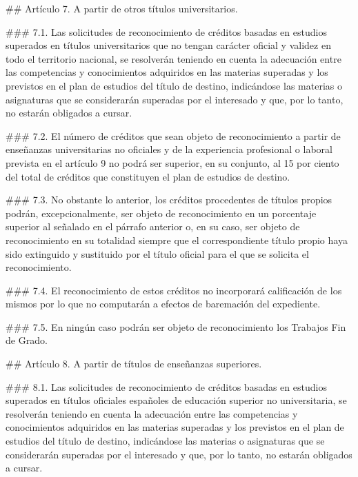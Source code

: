 \documentclass{article}
\begin{document}
\begin{itemize}
\begin{itemize}
\begin{scriptsize}
                  \#\# Artículo 7. A partir de otros títulos universitarios.

                  \#\#\# 7.1.
                  Las solicitudes de reconocimiento de créditos basadas en estudios superados en títulos universitarios que no tengan carácter oficial y validez en todo el territorio nacional, se resolverán teniendo en cuenta la adecuación entre las competencias y conocimientos adquiridos en las materias superadas y los previstos en el plan de estudios del título de destino, indicándose las materias o asignaturas que se considerarán superadas por el interesado y que, por lo tanto, no estarán obligados a cursar.

                  \#\#\# 7.2.
                  El número de créditos que sean objeto de reconocimiento a partir de enseñanzas universitarias no oficiales y de la experiencia profesional o laboral prevista en el artículo 9 no podrá ser superior, en su conjunto, al 15 por ciento del total de créditos que constituyen el plan de estudios de destino.

                  \#\#\# 7.3.
                  No obstante lo anterior, los créditos procedentes de títulos propios podrán, excepcionalmente, ser objeto de reconocimiento en un porcentaje superior al señalado en el párrafo anterior o, en su caso, ser objeto de reconocimiento en su totalidad siempre que el correspondiente título propio haya sido extinguido y sustituido por el título oficial para el que se solicita el reconocimiento.

                  \#\#\# 7.4.
                  El reconocimiento de estos créditos no incorporará calificación de los mismos por lo que no computarán a efectos de baremación del expediente.

                  \#\#\# 7.5.
                  En ningún caso podrán ser objeto de reconocimiento los Trabajos Fin de Grado.

                  \#\# Artículo 8. A partir de títulos de enseñanzas superiores.

                  \#\#\# 8.1.
                  Las solicitudes de reconocimiento de créditos basadas en estudios superados en títulos oficiales españoles de educación superior no universitaria, se resolverán teniendo en cuenta la adecuación entre las competencias y conocimientos adquiridos en las materias superadas y los previstos en el plan de estudios del título de destino, indicándose las materias o asignaturas que se considerarán superadas por el interesado y que, por lo tanto, no estarán obligados a cursar.


\end{scriptsize}
\end{itemize}
\end{itemize}
\end{document}
